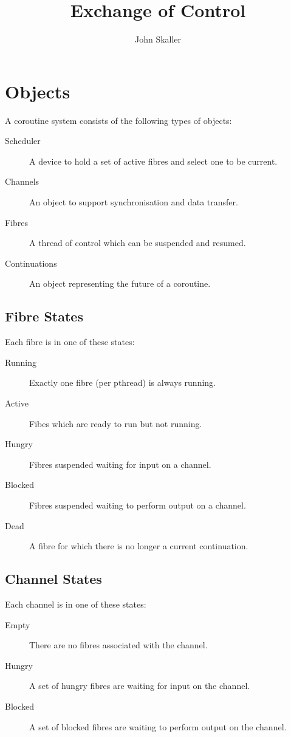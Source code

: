 \documentclass{article}
\title{Exchange of Control}
\author{John Skaller}
\begin{document}
\maketitle
\section{Objects}
A coroutine system consists of the following types of objects:
\begin{description}
\item[Scheduler] A device to hold a set of active fibres and
select one to be current.
\item[Channels] An object to support synchronisation and data transfer.
\item[Fibres] A thread of control which can be suspended and resumed.
\item[Continuations] An object representing the future of a coroutine.
\end{description}

\subsection{Fibre States}
Each fibre is in one of these states:
\begin{description}
\item[Running] Exactly one fibre (per pthread) is always running.
\item[Active] Fibes which are ready to run but not running.
\item[Hungry] Fibres suspended waiting for input on a channel.
\item[Blocked] Fibres suspended waiting to perform output on a channel.
\item[Dead] A fibre for which there is no longer a current continuation.
\end{description}

\subsection{Channel States}
Each channel is in one of these states:
\begin{description}
\item[Empty] There are no fibres associated with the channel.
\item[Hungry] A set of hungry fibres are waiting for input on the channel.
\item[Blocked] A set of blocked fibres are waiting to perform output on the channel.
\end{description}
\end{document}
